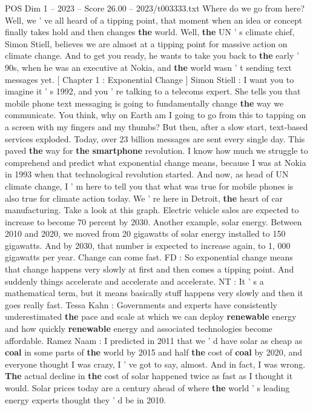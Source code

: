 \begin{textsample}{POS Dim 1 – 2023 – Score 26.00 – 2023/t003333.txt}
Where do we go from here?
Well, we ' ve all heard of a tipping point, that moment when an idea or concept finally takes hold and then changes \textbf{the} world.
Well, \textbf{the} UN ' s climate chief, Simon Stiell, believes we are almost at a tipping point for massive action on climate change.
And to get you ready, he wants to take you back to \textbf{the} early ' 90s, when he was an executive at Nokia, and \textbf{the} world wasn ' t sending text messages yet. [ Chapter 1 : Exponential Change ] Simon Stiell : I want you to imagine it ' s 1992, and you ' re talking to a telecoms expert.
She tells you that mobile phone text messaging is going to fundamentally change \textbf{the} way we communicate.
You think, why on Earth am I going to go from this to tapping on a screen with my fingers and my thumbs?
But then, after a slow start, text-based services exploded.
Today, over 23 billion messages are sent every single day.
This paved \textbf{the} way for \textbf{the} \textbf{smartphone} revolution.
I know how much we struggle to comprehend and predict what exponential change means, because I was at Nokia in 1993 when that technological revolution started.
And now, as head of UN climate change, I ' m here to tell you that what was true for mobile phones is also true for climate action today.
We ' re here in Detroit, \textbf{the} heart of car manufacturing.
Take a look at this graph.
Electric vehicle sales are expected to increase to become 70 percent by 2030.
Another example, solar energy.
Between 2010 and 2020, we moved from 20 gigawatts of solar energy installed to 150 gigawatts.
And by 2030, that number is expected to increase again, to 1, 000 gigawatts per year.
Change can come fast.
FD : So exponential change means that change happens very slowly at first and then comes a tipping point.
And suddenly things accelerate and accelerate and accelerate.
NT : It ' s a mathematical term, but it means basically stuff happens very slowly and then it goes really fast.
Tessa Kahn : Governments and experts have consistently underestimated \textbf{the} pace and scale at which we can deploy \textbf{renewable} energy and how quickly \textbf{renewable} energy and associated technologies become affordable.
Ramez Naam : I predicted in 2011 that we ' d have solar as cheap as \textbf{coal} in some parts of \textbf{the} world by 2015 and half \textbf{the} cost of \textbf{coal} by 2020, and everyone thought I was crazy, I ' ve got to say, almost.
And in fact, I was wrong. \textbf{The} actual decline in \textbf{the} cost of solar happened twice as fast as I thought it would.
Solar prices today are a century ahead of where \textbf{the} world ' s leading energy experts thought they ' d be in 2010.

\end{textsample}
